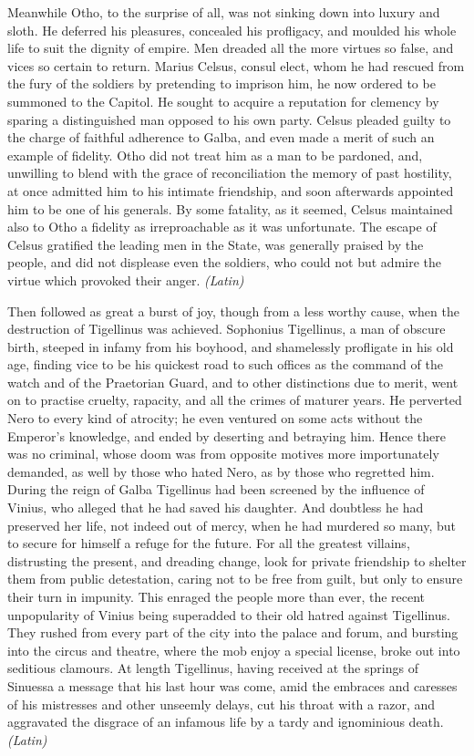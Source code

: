 
Meanwhile Otho, to the surprise of all, was not sinking down into luxury and sloth. He deferred his pleasures, concealed his profligacy, and moulded his whole life to suit the dignity of empire. Men dreaded all the more virtues so false, and vices so certain to return. Marius Celsus, consul elect, whom he had rescued from the fury of the soldiers by pretending to imprison him, he now ordered to be summoned to the Capitol. He sought to acquire a reputation for clemency by sparing a distinguished man opposed to his own party. Celsus pleaded guilty to the charge of faithful adherence to Galba, and even made a merit of such an example of fidelity. Otho did not treat him as a man to be pardoned, and, unwilling to blend with the grace of reconciliation the memory of past hostility, at once admitted him to his intimate friendship, and soon afterwards appointed him to be one of his generals. By some fatality, as it seemed, Celsus maintained also to Otho a fidelity as irreproachable as it was unfortunate. The escape of Celsus gratified the leading men in the State, was generally praised by the people, and did not displease even the soldiers, who could not but admire the virtue which provoked their anger. \emph{(Latin)}


Then followed as great a burst of joy, though from a less worthy cause, when the destruction of Tigellinus was achieved. Sophonius Tigellinus, a man of obscure birth, steeped in infamy from his boyhood, and shamelessly profligate in his old age, finding vice to be his quickest road to such offices as the command of the watch and of the Praetorian Guard, and to other distinctions due to merit, went on to practise cruelty, rapacity, and all the crimes of maturer years. He perverted Nero to every kind of atrocity; he even ventured on some acts without the Emperor's knowledge, and ended by deserting and betraying him. Hence there was no criminal, whose doom was from opposite motives more importunately demanded, as well by those who hated Nero, as by those who regretted him. During the reign of Galba Tigellinus had been screened by the influence of Vinius, who alleged that he had saved his daughter. And doubtless he had preserved her life, not indeed out of mercy, when he had murdered so many, but to secure for himself a refuge for the future. For all the greatest villains, distrusting the present, and dreading change, look for private friendship to shelter them from public detestation, caring not to be free from guilt, but only to ensure their turn in impunity. This enraged the people more than ever, the recent unpopularity of Vinius being superadded to their old hatred against Tigellinus. They rushed from every part of the city into the palace and forum, and bursting into the circus and theatre, where the mob enjoy a special license, broke out into seditious clamours. At length Tigellinus, having received at the springs of Sinuessa a message that his last hour was come, amid the embraces and caresses of his mistresses and other unseemly delays, cut his throat with a razor, and aggravated the disgrace of an infamous life by a tardy and ignominious death. \emph{(Latin)}

